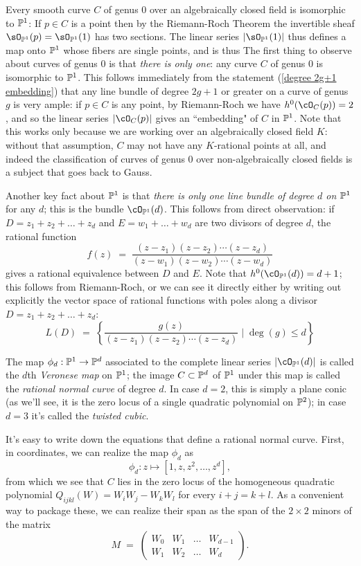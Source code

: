Every smooth curve $C$ of genus 0 over an algebraically closed field is isomorphic to $\PP^1$: If $p\in C$ is a point then by the Riemann-Roch Theorem the invertible sheaf $\sO_{\PP^1}(p)=\sO_{\PP^1}(1)$ has two sections. The linear series
$|\sO_{\PP^1}(1)|$ thus defines a map 
onto $\PP^1$ whose fibers are single points, and is thus
The first thing to observe about curves of genus 0 is that \emph{there is only one}: any curve $C$ of genus 0 is isomorphic to $\PP^1$. This follows immediately from the statement (\ref{degree 2g+1 embedding}) that any line bundle of degree $2g+1$ or greater on a curve of genus $g$ is very ample: if $p \in C$ is any point, by Riemann-Roch we have $h^0(\cO_C(p)) = 2$, and so the linear series $|\cO_C(p)|$ gives an ``embedding" of $C$ in $\PP^1$. Note that this works only because we are working over an algebraically closed field $K$: without that assumption, $C$ may not have any $K$-rational points at all, and indeed the classification of curves of genus 0 over non-algebraically closed fields is a subject that goes back to Gauss.

Another key fact about $\PP^1$ is that \emph{there is only one line bundle of degree $d$ on $\PP^1$} for any $d$; this is the bundle $\cO_{\PP^1}(d)$. This follows from direct observation: if $D = z_1+z_2+\dots+z_d$ and $E = w_1+\dots+w_d$ are two divisors of degree $d$, the rational function
$$
f(z) \; = \; \frac{(z-z_1)(z-z_2)\cdots(z-z_d)}{(z-w_1)(z-w_2)\cdots(z-w_d)}
$$
gives a rational equivalence between $D$ and $E$. Note that $h^0(\cO_{\PP^1}(d)) = d+1$; this follows from Riemann-Roch, or we can see it directly either by writing out explicitly the vector space of rational functions with poles along a divisor $D = z_1+z_2+\dots+z_d$:
$$
L(D) \; = \; \left\{ \frac{g(z)}{(z-z_1)(z-z_2)\cdots(z-z_d)} \mid \deg(g) \leq d \right\}
$$

The map $\phi_d : \PP^1 \to \PP^d$ associated to the complete linear series $|\cO_{\PP^1}(d)|$ is called the $d$th \emph{Veronese map} on $\PP^1$; the 
image $C \subset \PP^d$ of $\PP^1$ under this map  is called the \emph{rational normal curve} of degree $d$. In case $d=2$, this is simply a plane conic (as we'll see, it is the zero locus of a single quadratic polynomial on $\PP^2$); in case $d=3$ it's called the \emph{twisted cubic}.

It's easy to write down the equations that define a rational normal curve. First, in coordinates, we can realize the map $\phi_d$ as
$$
\phi_d : z \mapsto [1, z, z^2,\dots,z^d],
$$
from which we see that $C$ lies in the zero locus of the homogeneous quadratic polynomial $Q_{ijkl}(W) = W_iW_j - W_kW_l$ for every $i+j=k+l$. As a convenient way to package these, we can realize their span as the span of the $2\times 2$ minors of the matrix
$$
M \; = \; \begin{pmatrix}
W_0 & W_1 & \dots & W_{d-1} \\
W_1 & W_2 & \dots & W_d
\end{pmatrix}.
$$

